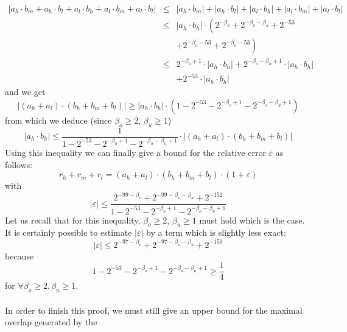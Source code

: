 \documentclass[a4paper,10pt,twoside]{article}
\newenvironment{proof}[1][Proof]{\begin{trivlist}
\item[\hskip \labelsep {\bfseries #1}]}{\end{trivlist}}
\newcommand{\hi}{\ensuremath{\mathit{h}}}
\newcommand{\mi}{\ensuremath{\mathit{m}}}
\newcommand{\lo}{\ensuremath{\mathit{l}}}
\renewcommand{\epsilon}{\varepsilon}
\begin{document}
\begin{proof}
\begin{eqnarray*}
\left \vert a_\hi \cdot b_\mi + a_\hi \cdot b_\lo + a_\lo \cdot b_\hi + a_\lo \cdot b_\mi + a_\lo \cdot b_\lo \right \vert & \leq & 
\left \vert a_\hi \cdot b_\mi \right \vert + 
\left \vert a_\hi \cdot b_\lo \right \vert + 
\left \vert a_\lo \cdot b_\hi \right \vert + 
\left \vert a_\lo \cdot b_\mi \right \vert + 
\left \vert a_\lo \cdot b_\lo \right \vert \\
& \leq & \left \vert a_\hi \cdot b_\hi \right \vert \cdot \left( 2^{-\beta_o}  + 
2^{-\beta_o-\beta_u} + 
2^{-53}  \right. \\ & & \left.  + 
2^{-\beta_o-53} + 
2^{-\beta_o-53} \right) \\
& \leq & 2^{-\beta_o+1} \cdot \left \vert a_\hi \cdot b_\hi \right \vert + 
2^{-\beta_o-\beta_u+1} \cdot \left \vert a_\hi \cdot b_\hi \right \vert  \\ & & + 
2^{-53} \cdot \left \vert a_\hi \cdot b_\hi \right \vert
\end{eqnarray*}
and we get
$$\left \vert \left( a_\hi + a_\lo \right) \cdot \left( b_\hi + b_\mi + b_\lo \right) \right \vert \geq 
\left \vert a_\hi \cdot b_\hi \right \vert \cdot \left( 1 - 2^{-53} - 2^{-\beta_o+1} -2^{-\beta_o-\beta_u+1} \right)$$
from which we deduce (since $\beta_o \geq 2$, $\beta_u \geq 1$) 
$$\left \vert a_\hi \cdot b_\hi \right \vert \leq \frac{1}{1 - 2^{-53} - 2^{-\beta_o+1} -2^{-\beta_o-\beta_u+1}} \cdot 
\left \vert \left( a_\hi + a_\lo \right) \cdot \left( b_\hi + b_\mi + b_\lo \right) \right \vert$$
Using this inequality we can finally give a bound for the relative error $\epsilon$ as follows:
$$r_\hi + r_\mi + r_\lo = \left( a_\hi + a_\lo \right) \cdot \left( b_\hi + b_\mi + b_\lo \right) \cdot \left( 1 + \epsilon \right)$$
with
$$\left \vert \epsilon \right \vert \leq 
\frac{2^{-99-\beta_o} + 2^{-99-\beta_o-\beta_u} + 2^{-152}}{1 - 2^{-53} - 2^{-\beta_o+1} -2^{-\beta_o-\beta_u+1}}$$
Let us recall that for this inequality, $\beta_o \geq 2$, $\beta_u \geq 1$ must hold which is the case.\\
It is certainly possible to estimate $\left \vert \epsilon \right \vert$ by a term which is slightly less exact:
$$\left \vert \epsilon \right \vert \leq 2^{-97 - \beta_o} + 2^{-97 - \beta_o - \beta_u} + 2^{-150}$$
because
$$1 - 2^{-53} - 2^{-\beta_o+1} -2^{-\beta_o-\beta_u+1} \geq \frac{1}{4}$$
for $\forall \beta_o \geq 2, \beta_u \geq 1$.\\~\\
In order to finish this proof, we must still give an upper bound for the maximal overlap generated by the 

\end{proof}
\end{document}
